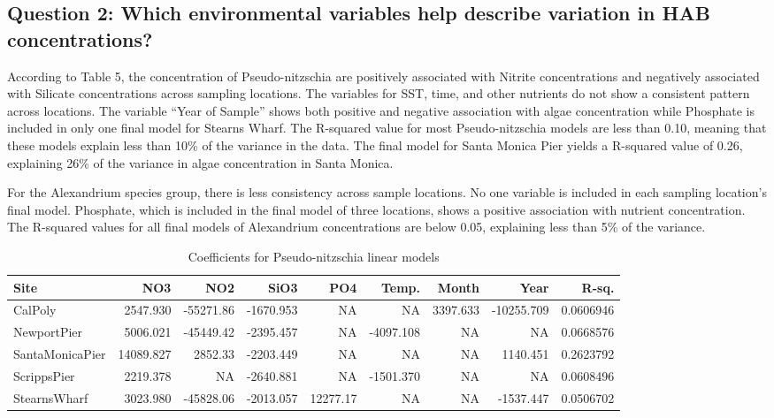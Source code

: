 \documentclass[
  12pt,
]{article}
\begin{document}
\newpage

\hypertarget{question-2-which-environmental-variables-help-describe-variation-in-hab-concentrations}{%
\subsection{Question 2: Which environmental variables help describe
variation in HAB
concentrations?}\label{question-2-which-environmental-variables-help-describe-variation-in-hab-concentrations}}

According to Table 5, the concentration of Pseudo-nitzschia are
positively associated with Nitrite concentrations and negatively
associated with Silicate concentrations across sampling locations. The
variables for SST, time, and other nutrients do not show a consistent
pattern across locations. The variable ``Year of Sample'' shows both
positive and negative association with algae concentration while
Phosphate is included in only one final model for Stearns Wharf. The
R-squared value for most Pseudo-nitzschia models are less than 0.10,
meaning that these models explain less than 10\% of the variance in the
data. The final model for Santa Monica Pier yields a R-squared value of
0.26, explaining 26\% of the variance in algae concentration in Santa
Monica.

For the Alexandrium species group, there is less consistency across
sample locations. No one variable is included in each sampling
location's final model. Phosphate, which is included in the final model
of three locations, shows a positive association with nutrient
concentration. The R-squared values for all final models of Alexandrium
concentrations are below 0.05, explaining less than 5\% of the variance.

\begingroup\fontsize{9}{11}\selectfont

\begin{longtable}[t]{lrrrrrrrr}
\caption{\label{tab:LM Output Tables}Coefficients for Pseudo-nitzschia linear models}\\
\toprule
Site & NO3 & NO2 & SiO3 & PO4 & Temp. & Month & Year & R-sq.\\
\midrule
CalPoly & 2547.930 & -55271.86 & -1670.953 & NA & NA & 3397.633 & -10255.709 & 0.0606946\\
NewportPier & 5006.021 & -45449.42 & -2395.457 & NA & -4097.108 & NA & NA & 0.0668576\\
SantaMonicaPier & 14089.827 & 2852.33 & -2203.449 & NA & NA & NA & 1140.451 & 0.2623792\\
ScrippsPier & 2219.378 & NA & -2640.881 & NA & -1501.370 & NA & NA & 0.0608496\\
StearnsWharf & 3023.980 & -45828.06 & -2013.057 & 12277.17 & NA & NA & -1537.447 & 0.0506702\\
\bottomrule
\end{longtable}
\endgroup{}
\end{document}
